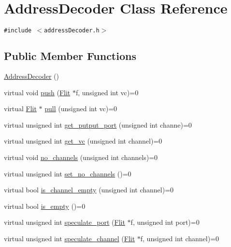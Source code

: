\hypertarget{classAddressDecoder}{
\section{AddressDecoder Class Reference}
\label{classAddressDecoder}
}
{\tt \#include $<$addressDecoder.h$>$}

\subsection*{Public Member Functions}
\begin{CompactItemize}
\item 
\hyperlink{classAddressDecoder_6b0422d043465fb94496c5b18670eaa9}{AddressDecoder} ()
\item 
virtual void \hyperlink{classAddressDecoder_563cbf350d2fc3a146b2c772d602fabe}{push} (\hyperlink{classFlit}{Flit} $\ast$f, unsigned int vc)=0
\item 
virtual \hyperlink{classFlit}{Flit} $\ast$ \hyperlink{classAddressDecoder_f2306deca445f763b23298004ec3d148}{pull} (unsigned int vc)=0
\item 
virtual unsigned int \hyperlink{classAddressDecoder_c0af5cdc36abf0ad772d3e7d7f757ad5}{get\_\-putput\_\-port} (unsigned int channe)=0
\item 
virtual unsigned int \hyperlink{classAddressDecoder_aa272b780bcdf94f0e46936ba78c7419}{get\_\-vc} (unsigned int channel)=0
\item 
virtual void \hyperlink{classAddressDecoder_9c9fd754c94031dc6c3d185bbd54dd61}{no\_\-channels} (unsigned int channels)=0
\item 
virtual unsigned int \hyperlink{classAddressDecoder_e71176376557406822e5e17f7e7d5436}{set\_\-no\_\-channels} ()=0
\item 
virtual bool \hyperlink{classAddressDecoder_2e53d896e3d6f66deb19beae4a1f4cf7}{is\_\-channel\_\-empty} (unsigned int channel)=0
\item 
virtual bool \hyperlink{classAddressDecoder_0054878bbba62055a8e42934152098fc}{is\_\-empty} ()=0
\item 
virtual unsigned int \hyperlink{classAddressDecoder_a8622bef1f397accdc7f2d255bed7f6b}{speculate\_\-port} (\hyperlink{classFlit}{Flit} $\ast$f, unsigned int port)=0
\item 
virtual unsigned int \hyperlink{classAddressDecoder_393586a5ded36349944cac2f9de11364}{speculate\_\-channel} (\hyperlink{classFlit}{Flit} $\ast$f, unsigned int channel)=0
\end{CompactItemize}


